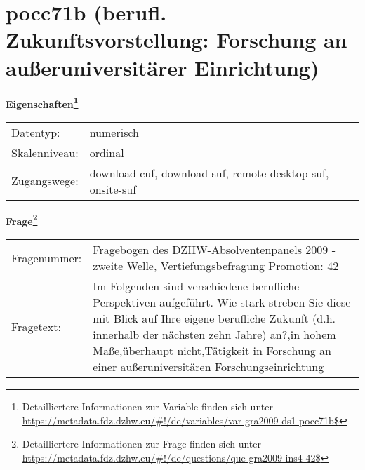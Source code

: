 
    \setcounter{footnote}{0}

    \vspace*{-1.8cm}
	\section{pocc71b (berufl. Zukunftsvorstellung: Forschung an außeruniversitärer Einrichtung)}
	\label{section:pocc71b}



    \vspace*{0.5cm}
    \noindent\textbf{Eigenschaften\footnote{Detailliertere Informationen zur Variable finden sich unter
		\url{https://metadata.fdz.dzhw.eu/\#!/de/variables/var-gra2009-ds1-pocc71b$}}}\\
	\begin{tabularx}{\hsize}{@{}lX}
	Datentyp: & numerisch \\
	Skalenniveau: & ordinal \\
	Zugangswege: &
	  download-cuf, 
	  download-suf, 
	  remote-desktop-suf, 
	  onsite-suf
 \\
    \end{tabularx}



				\vspace*{0.5cm}
                \noindent\textbf{Frage\footnote{Detailliertere Informationen zur Frage finden sich unter
		              \url{https://metadata.fdz.dzhw.eu/\#!/de/questions/que-gra2009-ins4-42$}}}\\
				\begin{tabularx}{\hsize}{@{}lX}
					Fragenummer: &
					  Fragebogen des DZHW-Absolventenpanels 2009 - zweite Welle, Vertiefungsbefragung Promotion:
					  42
 \\
					Fragetext: & Im Folgenden sind verschiedene berufliche Perspektiven aufgeführt. Wie stark streben Sie diese mit Blick auf Ihre eigene berufliche Zukunft (d.h. innerhalb der nächsten zehn Jahre) an?,in hohem Maße,überhaupt nicht,Tätigkeit in Forschung an einer außeruniversitären Forschungseinrichtung \\
				\end{tabularx}





